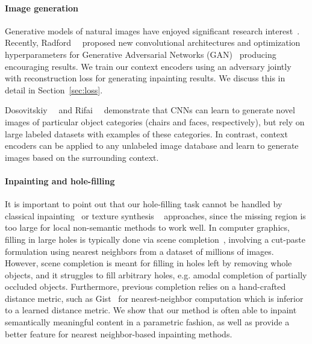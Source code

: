 \documentclass[10pt,twocolumn,letterpaper]{article}
\begin{document}
\paragraph{Image generation}
Generative models of natural images have enjoyed significant research interest~\cite{ranzato2013modeling,kingma2013auto,goodfellow2014generative}.
Recently, Radford~\etal~\cite{dcgan} proposed new convolutional architectures and optimization hyperparameters for Generative Adversarial Networks (GAN)~\cite{goodfellow2014generative} producing encouraging results.
We train our context encoders using an adversary jointly with reconstruction loss for generating inpainting results.
We discuss this in detail in Section~\ref{sec:loss}.
%
%
%
%

Dosovitskiy~\etal~\cite{chairs} and Rifai~\etal~\cite{torontofaces} demonstrate that CNNs can learn to generate novel images of particular object categories (chairs and faces, respectively), but rely on large labeled datasets with examples of these categories.
In contrast, context encoders can be applied to any unlabeled image database and learn to generate images based on the surrounding context.

%
%
%
%
%
%
%
%
%

\paragraph{Inpainting and hole-filling}
It is important to point out that our hole-filling task cannot be handled by classical inpainting~\cite{bertalmio2000image,osher2005iterative} or texture synthesis ~\cite{efros1999texture,barnes2009patchmatch} approaches, since the missing region is too large for local non-semantic methods to work well.
In computer graphics, filling in large holes is typically done via scene completion~\cite{hays2007scene}, involving a cut-paste formulation using nearest neighbors from a dataset of millions of images. However, scene completion is meant for filling in holes left by removing whole objects, and it struggles to fill arbitrary holes, e.g. amodal completion of partially occluded objects.
%
Furthermore, previous completion relies on a hand-crafted distance metric, such as Gist~\cite{gist} for nearest-neighbor computation which is inferior to a learned distance metric.
%
We show that our method is often able to inpaint semantically meaningful content in a parametric fashion, as well as provide a better feature for nearest neighbor-based inpainting methods.
%

%
\end{document}

